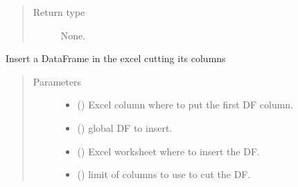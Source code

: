 \documentclass[letterpaper,10pt,english]{sphinxmanual}
\begin{document}
\begin{fulllineitems}
\begin{fulllineitems}
\begin{quote}
\begin{description}
\item[{Return type}] \leavevmode
None.

\end{description}\end{quote}

\end{fulllineitems}


\begin{fulllineitems}
\label{\detokenize{api/postprocessing:output.ExcelOutputSheet.insert_cutted_df}}
Insert a DataFrame in the excel cutting its columns
\begin{quote}\begin{description}
\item[{Parameters}] \leavevmode\begin{itemize}
\item {} 
 () \textendash{} Excel column where to put the first DF column.

\item {} 
 () \textendash{} global DF to insert.

\item {} 
 () \textendash{} Excel worksheet where to insert the DF.

\item {} 
 () \textendash{} limit of columns to use to cut the DF.


\end{itemize}
\end{description}
\end{quote}
\end{fulllineitems}
\end{fulllineitems}
\end{document}
